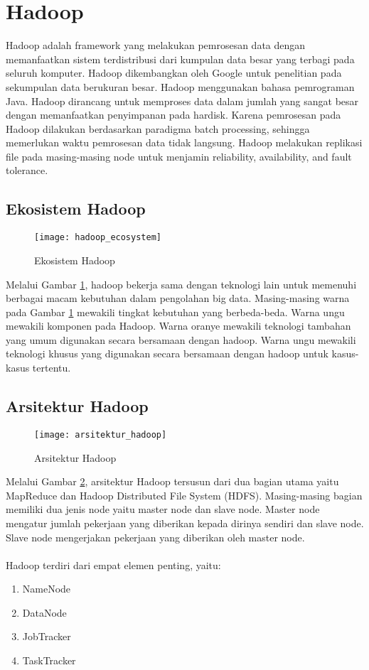 \section{Hadoop}
Hadoop adalah framework yang melakukan pemrosesan data dengan memanfaatkan sistem terdistribusi dari kumpulan data besar yang terbagi pada seluruh  komputer. Hadoop dikembangkan oleh Google untuk penelitian pada sekumpulan data berukuran besar. Hadoop menggunakan bahasa pemrograman Java. Hadoop dirancang untuk memproses data dalam jumlah yang sangat besar dengan memanfaatkan penyimpanan pada hardisk. Karena pemrosesan pada Hadoop dilakukan berdasarkan paradigma batch processing, sehingga memerlukan waktu pemrosesan data tidak langsung. Hadoop melakukan replikasi file pada masing-masing node untuk menjamin reliability, availability, and fault tolerance.

\subsection{Ekosistem Hadoop}
\begin{figure}[H]
	\centering
	\texttt{[image: hadoop\_ecosystem]}
	\caption{Ekosistem Hadoop}
	\label{fig:hadoop_ecosystem}
\end{figure}
Melalui Gambar \ref{fig:hadoop_ecosystem}, hadoop bekerja sama dengan teknologi lain untuk memenuhi berbagai macam kebutuhan dalam pengolahan big data. Masing-masing warna pada Gambar \ref{fig:hadoop_ecosystem} mewakili tingkat kebutuhan yang berbeda-beda. Warna ungu mewakili komponen pada Hadoop. Warna oranye mewakili teknologi tambahan yang umum digunakan secara bersamaan dengan hadoop. Warna ungu mewakili teknologi khusus yang digunakan secara bersamaan dengan hadoop untuk kasus-kasus tertentu.

\subsection{Arsitektur Hadoop}
\begin{figure}[H]
	\centering
	\texttt{[image: arsitektur\_hadoop]}
	\caption{Arsitektur Hadoop}
	\label{fig:arsitektur_hadoop}
\end{figure}
Melalui Gambar \ref{fig:arsitektur_hadoop}, arsitektur Hadoop tersusun dari dua bagian utama yaitu MapReduce dan Hadoop Distributed File System (HDFS). Masing-masing bagian memiliki dua jenis node yaitu master node dan slave node. Master node mengatur jumlah pekerjaan yang diberikan kepada dirinya sendiri dan slave node. Slave node mengerjakan pekerjaan yang diberikan oleh master node.
\\\\
Hadoop terdiri dari empat elemen penting, yaitu:
\begin{enumerate}
\item NameNode
\item DataNode
\item JobTracker
\item TaskTracker
\end{enumerate}

